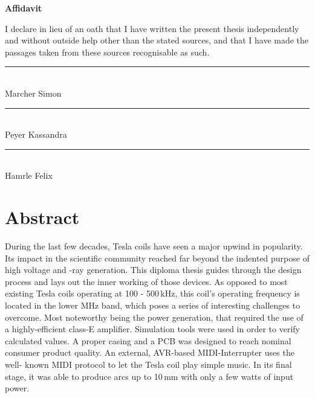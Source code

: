 \begin{center}
\textbf{\huge Affidavit}
\end{center}


\vspace*{2cm}
\begin{center}
\begin{minipage}{0.9\textwidth}
\begin{center}
I declare in lieu of an oath that I have written the present thesis independently and without outside help other than the stated sources, and that I have made the passages taken from these sources recognisable as such.
\end{center}
\end{minipage}
\end{center}


\vfill

\parbox{\textwidth}{
    \parbox{4cm}{
      \centering
      \rule{4cm}{1pt}\\
       Marcher Simon
    }
    \hfill
    \parbox{4cm}{
      \centering
      \rule{4cm}{1pt}\\
      Peyer Kassandra
    }
    \hfill
    \parbox{4cm}{
      \centering
      \rule{4cm}{1pt}\\
      Hamrle Felix
    }
}

\chapter*{Abstract}

During the last few decades, Tesla coils have seen a major upwind in popularity. Its impact in the scientific community reached far beyond the indented purpose of high voltage and -ray generation. This diploma thesis guides through the design process and lays out the inner working of those devices. As opposed to most existing Tesla coils operating at 100 \hspace{10pt}- 500\,kHz, this coil's operating frequency is located in the lower MHz band, which poses a series of interesting challenges to overcome. Most noteworthy being the power generation, that required the use of a highly-efficient class-E amplifier. Simulation tools were used \hspace{10pt}in order to verify calculated values. A proper casing and a PCB was designed to reach nominal consumer product quality. An external, AVR-based MIDI-Interrupter uses the well- known MIDI protocol to let the Tesla coil play simple music. In its final stage, it was able to produce arcs up to 10\,mm with only a few watts of input power.

